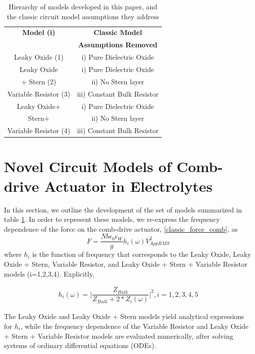 \begin{table}[!htb]
\begin{center}
{\begin{tabular}{|c|c|}
	\hline
	\textbf{Model (i)} & \textbf{Classic Model} \\
     &  \textbf{Assumptions Removed} \\
    \hline
    Leaky Oxide (1) & i) Pure Dielectric Oxide\\
    \hline
    Leaky Oxide  & i) Pure Dielectric Oxide \\
    + Stern (2)    & ii)  No Stern layer \\
    \hline
    Variable Resistor (3) & iii) Constant Bulk Resistor \\
    \hline
    Leaky Oxide+ & i) Pure Dielectric Oxide\\
    Stern+   & ii)  No Stern layer \\
     Variable Resistor (4) & iii) Constant Bulk Resistor  \\
    \hline  
\end{tabular}}
\caption{Hierarchy of models developed in this paper, and the classic circuit model assumptions they address}\label{hiearchy_table}
\end{center}
\end{table}


\section{Novel Circuit Models of Comb-drive Actuator in Electrolytes}
In this section, we outline the development of the set of models summarized in table \ref{hiearchy_table}. In order to represent these models, we re-express the frequency dependence of the force on the comb-drive actuator, \ref{classic_force_comb}, as
\begin{equation}\label{general_red_force_comb}
F = \dfrac{Nb\epsilon_0\epsilon_W}{g}h_i(\omega)V_{AppRMS}^2
\end{equation}
where $h_i$ is the function of frequency that corresponds to the Leaky Oxide, Leaky Oxide + Stern, Variable Resistor, and Leaky Oxide + Stern + Variable Resistor models (i=1,2,3,4). Explicitly, 

\begin{align}\label{gen_freq_eqn}
h_i(\omega) = \bigg|\dfrac{Z_{Bulk}}{Z_{Bulk}+2*Z_i(\omega)}\bigg|^2,  i=1,2,3,4,5
\end{align}

The Leaky Oxide and Leaky Oxide + Stern models yield analytical expressions for $h_i$, while the frequency dependence of the Variable Resistor and Leaky Oxide + Stern + Variable Resistor models are evaluated numerically, after solving systems of ordinary differential equations (ODEs). 
 
